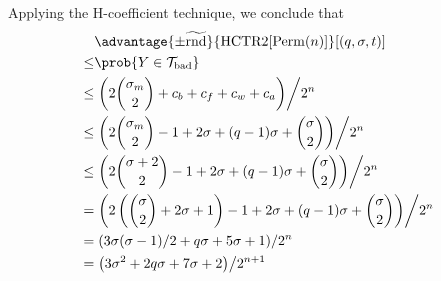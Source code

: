 \documentclass[hctr2.tex]{subfiles}
\begin{document}
Applying the H-coefficient technique, we conclude that
\begin{align*}
    & \advantage{\pm\widetilde{\mathrm{rnd}}}{\HCTR[\Perm(n)]}[(q, \sigma, t)] \\
    \leq & \prob{Y \in \Tb} \\
    \leq & \left.\left(2\binom{\sigma_m}{2} + c_b + c_f + c_w + c_a\right)\middle/2^n\right. \\
    \leq & \left.\left(2\binom{\sigma_m}{2} - 1 + 2\sigma + (q-1)\sigma + \binom{\sigma}{2}\right)\middle/2^n\right. \\
    \leq & \left.\left(2\binom{\sigma + 2}{2} - 1 + 2\sigma + (q-1)\sigma + \binom{\sigma}{2}\right)\middle/2^n\right. \\
    = & \left.\left(2\left(\binom{\sigma}{2} + 2\sigma + 1\right) - 1 + 2\sigma + (q-1)\sigma + \binom{\sigma}{2}\right)\middle/2^n\right. \\
    = & \left.\left(3\sigma(\sigma - 1)/2 + q\sigma + 5\sigma + 1\right)\middle/2^n\right. \\
    = & \left.\left(3\sigma^2 + 2q\sigma + 7\sigma + 2\right)\middle/2^{n+1}\right.
\end{align*}
\end{document}
